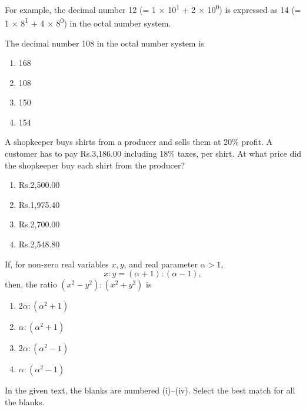     For example, the decimal number 12 (= 1 $\times$ 10\textsuperscript{1} + 2 $\times$ 10\textsuperscript{0}) is expressed as 14 (= 1 $\times$ 8\textsuperscript{1} + 4 $\times$ 8\textsuperscript{0}) in the octal number system.

    The decimal number 108 in the octal number system is

    \begin{enumerate}
        \item 168
        \item 108
        \item 150
        \item 154
    \end{enumerate}

    \item A shopkeeper buys shirts from a producer and sells them at 20\% profit. A customer has to pay Rs.3,186.00 including 18\% taxes, per shirt. At what price did the shopkeeper buy each shirt from the producer?

    \begin{enumerate}
        \item Rs.2,500.00
        \item Rs.1,975.40
        \item Rs.2,700.00
        \item Rs.2,548.80
    \end{enumerate}

    \item If, for non-zero real variables \( x, y \), and real parameter \( \alpha > 1 \),
    \[
    x : y = (\alpha + 1) : (\alpha - 1),
    \]
    then, the ratio \( (x^2 - y^2) : (x^2 + y^2) \) is

    \begin{enumerate}
        \item \( 2\alpha : (\alpha^2 + 1) \)
        \item \( \alpha : (\alpha^2 + 1) \)
        \item \( 2\alpha : (\alpha^2 - 1) \)
        \item \( \alpha : (\alpha^2 - 1) \)
    \end{enumerate}
\item In the given text, the blanks are numbered (i)--(iv). Select the best match for all the blanks.


